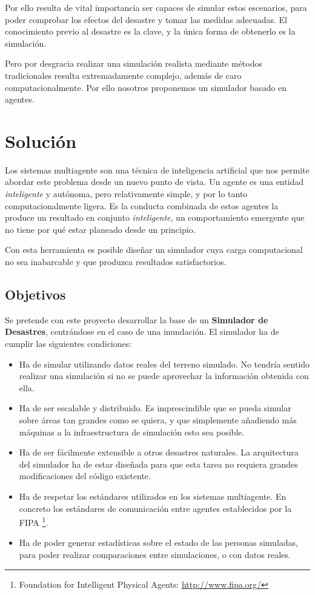 Por ello resulta de vital importancia ser capaces de simular estos escenarios,
para poder comprobar los efectos del desastre y tomar las medidas adecuadas. El
conocimiento previo al desastre es la clave, y la única forma de obtenerlo es
la simulación.

Pero por desgracia realizar una simulación realista mediante métodos
tradicionales resulta extremadamente complejo, además de caro
computacionalmente. Por ello nosotros proponemos un simulador basado en agentes.

\section{Solución}

Los sistemas multiagente son una técnica de inteligencia artificial que nos
permite abordar este problema desde un nuevo punto de vista. Un agente es una
entidad {\em inteligente} y autónoma, pero relativamente simple, y por lo tanto
computacionalmente ligera. Es la conducta combinada de estos agentes la produce
un resultado en conjunto {\em inteligente}, un comportamiento emergente que no
tiene por qué estar planeado desde un principio.

Con esta herramienta es posible diseñar un simulador cuya carga computacional
no sea inabarcable y que produzca resultados satisfactorios.

\subsection{Objetivos}

Se pretende con este proyecto desarrollar la base de un {\bf Simulador de
Desastres}, centrándose en el caso de una inundación. El simulador ha de cumplir
las siguientes condiciones:

\begin{itemize}
 \item Ha de simular utilizando datos reales del terreno simulado. No tendría
sentido realizar una simulación si no se puede aprovechar la información
obtenida con ella.
 \item Ha de ser escalable y distribuido. Es imprescindible que se pueda
simular sobre áreas tan grandes como se quiera, y que simplemente añadiendo más
máquinas a la infraestructura de simulación esto sea posible.
 \item Ha de ser fácilmente extensible a otros desastres naturales. La
arquitectura del simulador ha de estar diseñada para que esta tarea no requiera
grandes modificaciones del código existente.
 \item Ha de respetar los estándares utilizados en los sistemas multiagente. En
concreto los estándares de comunicación entre agentes establecidos por la FIPA
\footnote{Foundation for Intelligent Physical Agents:
\url{http://www.fipa.org/}}.
 \item Ha de poder generar estadísticas sobre el estado de las personas
simuladas, para poder realizar comparaciones entre simulaciones, o con datos
reales.
\end{itemize}

